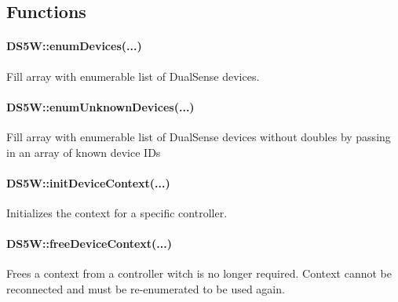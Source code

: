\\

\\

\\

\\

\\

\newpage

\subsection{Functions}

\paragraph{DS5W::enumDevices(...)}
Fill array with enumerable list of DualSense devices.\\


\paragraph{DS5W::enumUnknownDevices(...)}
Fill array with enumerable list of DualSense devices without doubles by passing in an array of known device IDs\\


\paragraph{DS5W::initDeviceContext(...)}
Initializes the context for a specific controller.\\


\paragraph{DS5W::freeDeviceContext(...)}
Frees a context from a controller witch is no longer required. Context cannot be reconnected and must be re-enumerated to be used again.\\


